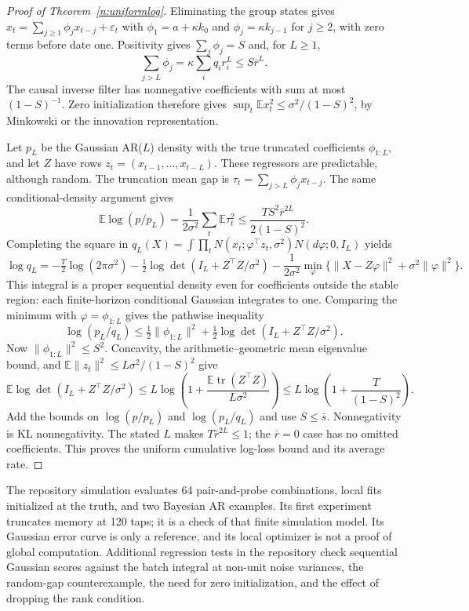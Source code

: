 \documentclass[12pt]{article}
\theoremstyle{definition}
\theoremstyle{remark}
\begin{document}
\begin{proof}[Proof of Theorem~\ref{n:uniformlog}]
Eliminating the group states gives $x_t=\sum_{j\ge1}\phi_jx_{t-j}+\varepsilon_t$ with $\phi_1=a+\kappa k_0$ and $\phi_j=\kappa k_{j-1}$ for $j\ge2$, with zero terms before date one. Positivity gives $\sum_j\phi_j=S$ and, for $L\ge1$,
\[
\sum_{j>L}\phi_j=\kappa\sum_iq_ir_i^L\le S\bar r^L.
\]
The causal inverse filter has nonnegative coefficients with sum at most $(1-S)^{-1}$. Zero initialization therefore gives $\sup_t\mathbb E x_t^2\le\sigma^2/(1-S)^2$, by Minkowski or the innovation representation.

Let $p_L$ be the Gaussian AR($L$) density with the true truncated coefficients $\phi_{1:L}$, and let $Z$ have rows $z_t=(x_{t-1},\ldots,x_{t-L})$. These regressors are predictable, although random. The truncation mean gap is $\tau_t=\sum_{j>L}\phi_jx_{t-j}$. The same conditional-density argument gives
\[
\mathbb E\log(p/p_L)=\frac1{2\sigma^2}\sum_t\mathbb E\tau_t^2
\le\frac{TS^2\bar r^{2L}}{2(1-S)^2}.
\]
Completing the square in $q_L(X)=\int\prod_t N(x_t;\varphi^\top z_t,\sigma^2)N(d\varphi;0,I_L)$ yields
\[
\log q_L=-\tfrac T2\log(2\pi\sigma^2)-\tfrac12\log\det(I_L+Z^\top Z/\sigma^2)
-\frac1{2\sigma^2}\min_\varphi\{\|X-Z\varphi\|^2+\sigma^2\|\varphi\|^2\}.
\]
This integral is a proper sequential density even for coefficients outside the stable region: each finite-horizon conditional Gaussian integrates to one. Comparing the minimum with $\varphi=\phi_{1:L}$ gives the pathwise inequality
\[
\log(p_L/q_L)\le\tfrac12\|\phi_{1:L}\|^2+\tfrac12\log\det(I_L+Z^\top Z/\sigma^2).
\]
Now $\|\phi_{1:L}\|^2\le S^2$. Concavity, the arithmetic--geometric mean eigenvalue bound, and $\mathbb E\|z_t\|^2\le L\sigma^2/(1-S)^2$ give
\[
\mathbb E\log\det(I_L+Z^\top Z/\sigma^2)
\le L\log\left(1+\frac{\mathbb E\operatorname{tr}(Z^\top Z)}{L\sigma^2}\right)
\le L\log\left(1+\frac{T}{(1-S)^2}\right).
\]
Add the bounds on $\log(p/p_L)$ and $\log(p_L/q_L)$ and use $S\le\bar s$. Nonnegativity is KL nonnegativity. The stated $L$ makes $T\bar r^{2L}\le1$; the $\bar r=0$ case has no omitted coefficients. This proves the uniform cumulative log-loss bound and its average rate.
\end{proof}

The repository simulation evaluates 64 pair-and-probe combinations, local fits initialized at the truth, and two Bayesian AR examples. Its first experiment truncates memory at 120 taps; it is a check of that finite simulation model. Its Gaussian error curve is only a reference, and its local optimizer is not a proof of global computation. Additional regression tests in the repository check sequential Gaussian scores against the batch integral at non-unit noise variances, the random-gap counterexample, the need for zero initialization, and the effect of dropping the rank condition. 
\end{document}
